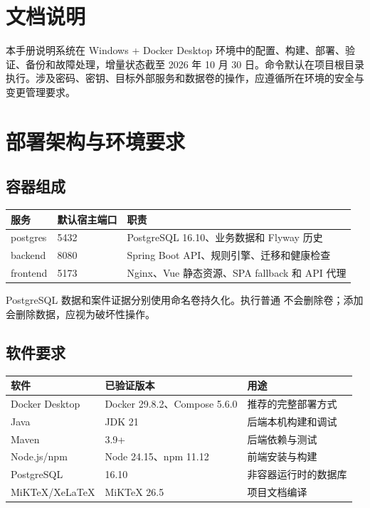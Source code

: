 \documentclass[UTF8,openany,zihao=-4]{ctexrep}
\begin{document}
\chapter*{文档说明}
本手册说明系统在 Windows + Docker Desktop 环境中的配置、构建、部署、验证、备份和故障处理，增量状态截至 2026 年 10 月 30 日。命令默认在项目根目录执行。涉及密码、密钥、目标外部服务和数据卷的操作，应遵循所在环境的安全与变更管理要求。
\tableofcontents
\clearpage
{}

\chapter{部署架构与环境要求}
\Needspace{0.62\textheight}
\section{容器组成}
\begin{longtable}{p{}p{}p{}}
\toprule 服务 & 默认宿主端口 & 职责 \\ \midrule
postgres & 5432 & PostgreSQL 16.10、业务数据和 Flyway 历史 \\
backend & 8080 & Spring Boot API、规则引擎、迁移和健康检查 \\
frontend & 5173 & Nginx、Vue 静态资源、SPA fallback 和 API 代理 \\
\bottomrule
\end{longtable}
PostgreSQL 数据和案件证据分别使用命名卷持久化。执行普通  不会删除卷；添加  会删除数据，应视为破坏性操作。

\Needspace{0.62\textheight}
\section{软件要求}
{\small
\renewcommand{\arraystretch}{1.08}
\begin{longtable}{p{}p{}p{}}
\toprule 软件 & 已验证版本 & 用途 \\ \midrule
Docker Desktop & Docker 29.8.2、Compose 5.6.0 & 推荐的完整部署方式 \\
Java & JDK 21 & 后端本机构建和调试 \\
Maven & 3.9+ & 后端依赖与测试 \\
Node.js/npm & Node 24.15、npm 11.12 & 前端安装与构建 \\
PostgreSQL & 16.10 & 非容器运行时的数据库 \\
MiKTeX/XeLaTeX & MiKTeX 26.5 & 项目文档编译 \\
\bottomrule
\end{longtable}
}
\end{document}
